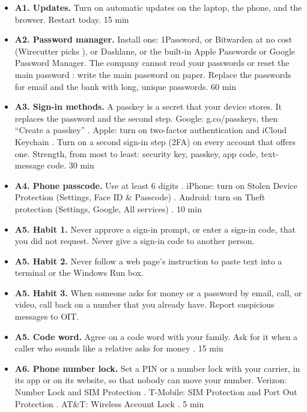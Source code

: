 \documentclass[10pt]{article}
\newcommand{\mins}[1]{\hfill{\footnotesize\color{gray}#1}}
\begin{document}
\begin{itemize}
\item \textbf{A1. Updates.} Turn on automatic updates on the laptop, the phone, and the browser. Restart today. \mins{15 min}
\item \textbf{A2. Password manager.} Install one: 1Password, or Bitwarden at no cost (Wirecutter picks \vfy), or Dashlane, or the built-in Apple Passwords or Google Password Manager. The company cannot read your passwords or reset the main password \vfy: write the main password on paper. Replace the passwords for email and the bank with long, unique passwords. \mins{60 min}
\item \textbf{A3. Sign-in methods.} A passkey is a secret that your device stores. It replaces the password and the second step. Google: g.co/passkeys, then ``Create a passkey'' \vfy. Apple: turn on two-factor authentication and iCloud Keychain \vfy. Turn on a second sign-in step (2FA) on every account that offers one. Strength, from most to least: security key, passkey, app code, text-message code. \mins{30 min}
\item \textbf{A4. Phone passcode.} Use at least 6 digits \vfy. iPhone: turn on Stolen Device Protection (Settings, Face ID \& Passcode) \vfy. Android: turn on Theft protection (Settings, Google, All services) \vfy. \mins{10 min}
\item \textbf{A5. Habit 1.} Never approve a sign-in prompt, or enter a sign-in code, that you did not request. Never give a sign-in code to another person.
\item \textbf{A5. Habit 2.} Never follow a web page's instruction to paste text into a terminal or the Windows Run box.
\item \textbf{A5. Habit 3.} When someone asks for money or a password by email, call, or video, call back on a number that you already have. Report suspicious messages to OIT.
\item \textbf{A5. Code word.} Agree on a code word with your family. Ask for it when a caller who sounds like a relative asks for money \vfy. \mins{15 min}
\item \textbf{A6. Phone number lock.} Set a PIN or a number lock with your carrier, in its app or on its website, so that nobody can move your number. Verizon: Number Lock and SIM Protection \vfy. T-Mobile: SIM Protection and Port Out Protection \vfy. AT\&T: Wireless Account Lock \vfy. \mins{5 min}
\end{itemize}
\end{document}
